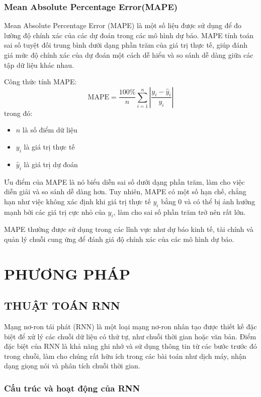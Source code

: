 \documentclass[conference]{IEEEtran}
\begin{document}
 

\subsubsection{Mean Absolute Percentage Error(MAPE)}

Mean Absolute Percentage Error (MAPE) là một số liệu được sử dụng để đo lường độ chính xác của các dự đoán trong các mô hình dự báo. MAPE tính toán sai số tuyệt đối trung bình dưới dạng phần trăm của giá trị thực tế, giúp đánh giá mức độ chính xác của dự đoán một cách dễ hiểu và so sánh dễ dàng giữa các tập dữ liệu khác nhau.

Công thức tính MAPE:
\[
\text{MAPE} = \frac{100\%}{n} \sum_{i=1}^{n} \left| \frac{y_i - \hat{y}_i}{y_i} \right|
\]
trong đó:
\begin{itemize}
    \item $n$ là số điểm dữ liệu
    \item $y_i$ là giá trị thực tế
    \item $\hat{y}_i$ là giá trị dự đoán
\end{itemize}

Ưu điểm của MAPE là nó biểu diễn sai số dưới dạng phần trăm, làm cho việc diễn giải và so sánh dễ dàng hơn. Tuy nhiên, MAPE có một số hạn chế, chẳng hạn như việc không xác định khi giá trị thực tế $y_i$ bằng 0 và có thể bị ảnh hưởng mạnh bởi các giá trị cực nhỏ của $y_i$, làm cho sai số phần trăm trở nên rất lớn.

MAPE thường được sử dụng trong các lĩnh vực như dự báo kinh tế, tài chính và quản lý chuỗi cung ứng để đánh giá độ chính xác của các mô hình dự báo.
\section{PHƯƠNG PHÁP}

\subsection{THUẬT TOÁN RNN}

 Mạng nơ-ron tái phát (RNN) là một loại mạng nơ-ron nhân tạo được thiết kế đặc biệt để xử lý các chuỗi dữ liệu có thứ tự, như chuỗi thời gian hoặc văn bản. Điểm đặc biệt của RNN là khả năng ghi nhớ và sử dụng thông tin từ các bước trước đó trong chuỗi, làm cho chúng rất hữu ích trong các bài toán như dịch máy, nhận dạng giọng nói và phân tích chuỗi thời gian.

\subsubsection{Cấu trúc và hoạt động của RNN}
\end{document}
